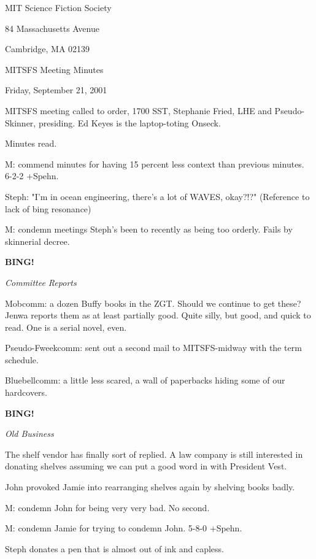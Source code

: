 \documentclass[12pt]{article}
\newcommand{\bing}{{\bf BING!} }
\newcommand{\goto}[1]{\bing \vskip 12pt \centerline{{\em{#1}}}}
\begin{document}
\begin{center}

MIT Science Fiction Society 

84 Massachusetts Avenue

Cambridge, MA 02139

\vspace{12pt}

MITSFS Meeting Minutes 

Friday, September 21, 2001

\end{center}
 
\vspace{18pt}

\setlength{\parskip}{6pt}

\noindent
MITSFS meeting called to order, 1700 SST, Stephanie Fried, LHE and
Pseudo-Skinner, presiding.  Ed Keyes is the laptop-toting Onseck.

Minutes read.

M: commend minutes for having 15 percent less context than previous minutes. 6-2-2 +Spehn.

Steph: "I'm in ocean engineering, there's a lot of WAVES, okay?!?" (Reference to lack of bing resonance)

M: condemn meetings Steph's been to recently as being too orderly. Fails by skinnerial decree.

\goto{Committee Reports}

Mobcomm: a dozen Buffy books in the ZGT. Should we continue to get these? Jenwa reports them as at least partially good. Quite silly, but good, and quick to read. One is a serial novel, even.

Pseudo-Fweekcomm: sent out a second mail to MITSFS-midway with the term schedule.

Bluebellcomm: a little less scared, a wall of paperbacks hiding some of our hardcovers.

\goto{Old Business}

The shelf vendor has finally sort of replied. A law company is still interested in donating shelves assuming we can put a good word in with President Vest.

John provoked Jamie into rearranging shelves again by shelving books badly.

M: condemn John for being very very bad. No second.

M: condemn Jamie for trying to condemn John. 5-8-0 +Spehn.

Steph donates a pen that is almost out of ink and capless.
\end{document}
